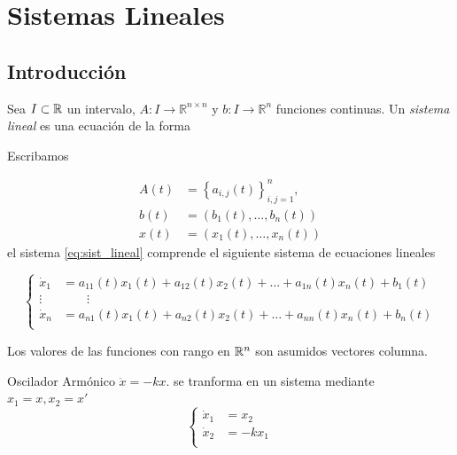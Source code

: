 \chapter{Sistemas Lineales }

\section{Introducción}
  
Sea $I\subset\mathbb{R}$ un intervalo, $A:I \rightarrow \mathbb{R}^{n \times n}$ y $b: I \rightarrow \mathbb{R}^{n}$ funciones continuas. Un \emph{sistema lineal} es una ecuación de la forma


Escribamos

\[
\begin{split} A(t) &=\left\{a_{i,j}(t) \right\}_{i,j=1}^{n}, \\
 b(t)&=(b_1(t),\ldots,b_n(t))\\
 x(t)&=(x_1(t),\ldots,x_n(t))
\end{split}
\]
el sistema \eqref{eq:sist_lineal} comprende el siguiente sistema de ecuaciones lineales



\begin{equation}\left\{
 \begin{split}
 \dot{x}_{1}&=a_{11}(t) x_{1}(t)+a_{12}(t) x_{2}(t)+\ldots+a_{1 n}(t) x_{n}(t)+b_{1}(t)\\
 \vdots &\qquad \vdots\\
  \dot{x}_{n}&=a_{n1}(t) x_{1}(t)+a_{n2}(t) x_{2}(t)+\ldots+a_{n n}(t) x_{n}(t)+b_{n}(t)\\
   \end{split} \right. 
\end{equation}


\begin{observa} Los valores de las funciones con rango en $\mathbb{R}^n$ son asumidos vectores columna. 
\end{observa}


\begin{ejemplo}{Oscilador Armónico}
$\ddot{x}=-kx$.
se tranforma en un sistema mediante $ x_{1}=x, x_{2}=x'$
\[
\left\{
\begin{split}
\dot{x}_{1}&=x_{2} \\
\dot{x}_{2}&=-k x_{1}\\
\end{split}
\right.
\]
\end{ejemplo}

